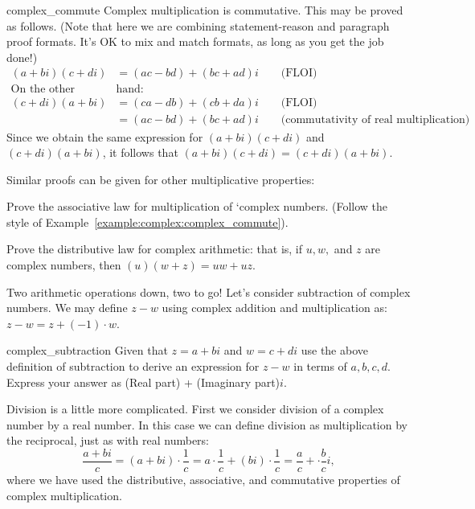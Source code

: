 \begin{example}{complex_commute}
Complex multiplication is commutative.  This may be proved as follows. (Note that here we are combining statement-reason and paragraph proof formats.  It's OK to mix and match formats, as long as you get the job done!) 
\begin{align*}
(a + bi)(c + di) &= (ac - bd) + (bc + ad)i \qquad \text{(FLOI)}\\
\text{On the other }&\text{hand:}\\
(c + di)(a + bi) &= (ca - db) + (cb + da)i \qquad \text{(FLOI)}\\
& = (ac - bd) + (bc + ad)i \qquad \text{(commutativity of real multiplication)}
\end{align*}
Since we obtain the same expression for $(a + bi)(c + di)$ and $(c + di)(a + bi)$, it follows that 
$(a + bi)(c + di) = (c + di)(a + bi)$.
\end{example}

Similar proofs can be given for other multiplicative properties:

\begin{exercise}{16}
Prove the associative law for multiplication of `complex numbers. (Follow the style of Example~\ref{example:complex:complex_commute}).
\end{exercise}

\begin{exercise}{17}
Prove the distributive law for complex arithmetic: that is, if $u,w,$ and $z$ are complex numbers, then $(u)(w+z) = uw + uz$.
\end{exercise}

Two arithmetic operations down, two to go!  Let's consider subtraction of complex numbers. We may define $z - w$ using complex addition and multiplication as:  $z - w = z + (-1)\cdot w$.

\begin{exercise}{complex_subtraction}
 Given that  $z = a + bi$ and $w = c + di$ use the above definition of subtraction to derive an  expression for  $z - w$  in terms of $a,b,c,d$.  Express your answer as (Real part)  + (Imaginary part)$i$.
\end{exercise}

Division is a little more complicated. First we consider division of a complex number by a real number.  In this case we can define division as multiplication by the reciprocal, just as with real numbers:
\begin{equation*}\label{eq:complex:1}
\frac{a + bi}{c} = (a + bi) \cdot \frac{1}{c} = a \cdot \frac{1}{c} + (bi) \cdot \frac{1}{c} = \frac{a}{c} + \cdot \frac{b}{c}i , 
\end{equation*}
where we have used the distributive, associative, and commutative properties of complex multiplication. 

